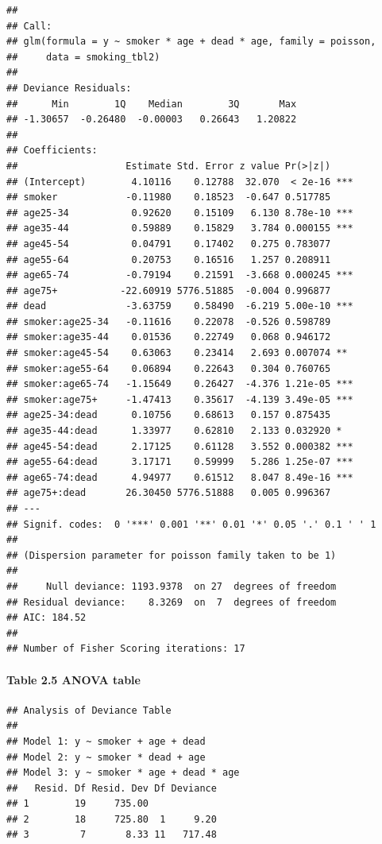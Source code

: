 \documentclass[]{article}
\let\oldparagraph\paragraph
\renewcommand{\paragraph}[1]{\oldparagraph{#1}\mbox{}}
\begin{document}
\begin{verbatim}
## 
## Call:
## glm(formula = y ~ smoker * age + dead * age, family = poisson, 
##     data = smoking_tbl2)
## 
## Deviance Residuals: 
##      Min        1Q    Median        3Q       Max  
## -1.30657  -0.26480  -0.00003   0.26643   1.20822  
## 
## Coefficients:
##                   Estimate Std. Error z value Pr(>|z|)    
## (Intercept)        4.10116    0.12788  32.070  < 2e-16 ***
## smoker            -0.11980    0.18523  -0.647 0.517785    
## age25-34           0.92620    0.15109   6.130 8.78e-10 ***
## age35-44           0.59889    0.15829   3.784 0.000155 ***
## age45-54           0.04791    0.17402   0.275 0.783077    
## age55-64           0.20753    0.16516   1.257 0.208911    
## age65-74          -0.79194    0.21591  -3.668 0.000245 ***
## age75+           -22.60919 5776.51885  -0.004 0.996877    
## dead              -3.63759    0.58490  -6.219 5.00e-10 ***
## smoker:age25-34   -0.11616    0.22078  -0.526 0.598789    
## smoker:age35-44    0.01536    0.22749   0.068 0.946172    
## smoker:age45-54    0.63063    0.23414   2.693 0.007074 ** 
## smoker:age55-64    0.06894    0.22643   0.304 0.760765    
## smoker:age65-74   -1.15649    0.26427  -4.376 1.21e-05 ***
## smoker:age75+     -1.47413    0.35617  -4.139 3.49e-05 ***
## age25-34:dead      0.10756    0.68613   0.157 0.875435    
## age35-44:dead      1.33977    0.62810   2.133 0.032920 *  
## age45-54:dead      2.17125    0.61128   3.552 0.000382 ***
## age55-64:dead      3.17171    0.59999   5.286 1.25e-07 ***
## age65-74:dead      4.94977    0.61512   8.047 8.49e-16 ***
## age75+:dead       26.30450 5776.51888   0.005 0.996367    
## ---
## Signif. codes:  0 '***' 0.001 '**' 0.01 '*' 0.05 '.' 0.1 ' ' 1
## 
## (Dispersion parameter for poisson family taken to be 1)
## 
##     Null deviance: 1193.9378  on 27  degrees of freedom
## Residual deviance:    8.3269  on  7  degrees of freedom
## AIC: 184.52
## 
## Number of Fisher Scoring iterations: 17
\end{verbatim}

\paragraph{Table 2.5 ANOVA table}\label{table-2.5-anova-table}

\begin{verbatim}
## Analysis of Deviance Table
## 
## Model 1: y ~ smoker + age + dead
## Model 2: y ~ smoker * dead + age
## Model 3: y ~ smoker * age + dead * age
##   Resid. Df Resid. Dev Df Deviance
## 1        19     735.00            
## 2        18     725.80  1     9.20
## 3         7       8.33 11   717.48
\end{verbatim}
\end{document}
